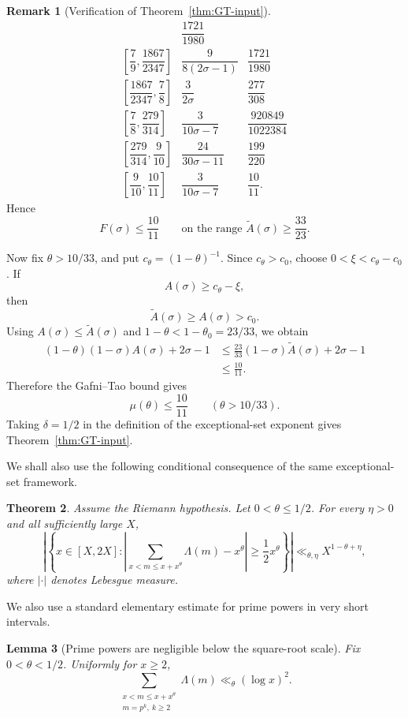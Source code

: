 \documentclass[11pt,reqno]{amsart}
\numberwithin{equation}{section}
\theoremstyle{plain}
\newtheorem{theorem}{Theorem}[section]
\newtheorem{lemma}[theorem]{Lemma}
\theoremstyle{definition}
\newtheorem{remark}[theorem]{Remark}
\begin{document}
\begin{remark}[Verification of Theorem~\ref{thm:GT-input}]
\[\begin{array}{c|c|c}
&
\dfrac{1721}{1980}
\\[6pt]
\left[\dfrac79,\dfrac{1867}{2347}\right]
&
\dfrac{9}{8(2\sigma-1)}
&
\dfrac{1721}{1980}
\\[6pt]
\left[\dfrac{1867}{2347},\dfrac78\right]
&
\dfrac{3}{2\sigma}
&
\dfrac{277}{308}
\\[6pt]
\left[\dfrac78,\dfrac{279}{314}\right]
&
\dfrac{3}{10\sigma-7}
&
\dfrac{920849}{1022384}
\\[6pt]
\left[\dfrac{279}{314},\dfrac9{10}\right]
&
\dfrac{24}{30\sigma-11}
&
\dfrac{199}{220}
\\[6pt]
\left[\dfrac9{10},\dfrac{10}{11}\right]
&
\dfrac{3}{10\sigma-7}
&
\dfrac{10}{11}.
\end{array}
\]
Hence
\[
        F(\sigma)\le \frac{10}{11}
        \qquad
        \text{on the range }\widetilde A(\sigma)\ge \frac{33}{23}.
\]

Now fix \(\theta>10/33\), and put \(c_\theta=(1-\theta)^{-1}\).  Since
\(c_\theta>c_0\), choose \(0<\xi<c_\theta-c_0\).  If
\[
        A(\sigma)\ge c_\theta-\xi,
\]
then
\[
        \widetilde A(\sigma)\ge A(\sigma)>c_0.
\]
Using \(A(\sigma)\le \widetilde A(\sigma)\) and
\(1-\theta<1-\theta_0=23/33\), we obtain
\[
\begin{aligned}
(1-\theta)(1-\sigma)A(\sigma)+2\sigma-1
&\le
\frac{23}{33}(1-\sigma)\widetilde A(\sigma)+2\sigma-1  \\
&\le \frac{10}{11}.
\end{aligned}
\]
Therefore the Gafni--Tao bound gives
\[
        \mu(\theta)\le \frac{10}{11}
        \qquad
        (\theta>10/33).
\]
Taking \(\delta=1/2\) in the definition of the exceptional-set exponent gives
Theorem~\ref{thm:GT-input}.
\end{remark}

We shall also use the following conditional consequence of the same
exceptional-set framework.

\begin{theorem}
\label{thm:GT-RH-input}
Assume the Riemann hypothesis.  Let $0<\theta\le 1/2$.  For every $\eta>0$ and
all sufficiently large $X$,
\[
\left|\left\{x\in[X,2X]:
\left|\sum_{x<m\le x+x^\theta}\Lambda(m)-x^\theta\right|
        \ge \frac12 x^\theta\right\}\right|
        \ll_{\theta,\eta} X^{1-\theta+\eta},
\]
where $|\cdot|$ denotes Lebesgue measure.
\end{theorem}

We also use a standard elementary estimate for prime powers in very short
intervals.

\begin{lemma}[Prime powers are negligible below the square-root scale]
\label{lem:prime-powers}
Fix $0<\theta<1/2$.  Uniformly for $x\ge2$,
\[
        \sum_{\substack{x<m\le x+x^\theta\\ m=p^k,\ k\ge2}} \Lambda(m)
        \ll_\theta (\log x)^2.
\]
\end{lemma}
\end{document}
